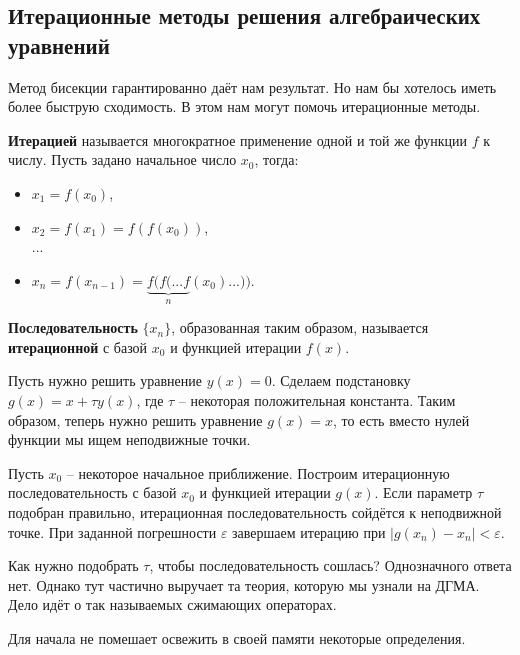 \documentclass[main.tex]{subfile}
\begin{document}
\subsection{Итерационные методы решения алгебраических уравнений}

Метод бисекции гарантированно даёт нам результат. Но нам бы хотелось иметь
более быструю сходимость. В этом нам могут помочь итерационные методы.

\begin{define}
	\textbf{Итерацией} называется многократное применение одной и той же
	функции $f$ к числу. Пусть задано начальное число $x_0$, тогда:
	\begin{itemize}[noitemsep, nolistsep]
		\item $x_1=f(x_0)$,
		\item $x_2=f(x_1)=f(f(x_0))$,\\
		...
		\item $x_n=f(x_{n-1})=\underset{n}{\underbrace{f(f(...f}}(x_0)...))$.
	\end{itemize}

	\textbf{Последовательность} $\{x_n\}$, образованная таким образом,
	называется \textbf{итерационной} с базой $x_0$ и функцией итерации $f(x)$.
\end{define}

\begin{algorithm}
	Пусть нужно решить уравнение $y(x)=0$. Сделаем подстановку
	$g(x)=x+\tau y(x)$, где $\tau$ -- некоторая положительная константа.
	Таким образом, теперь нужно решить уравнение $g(x)=x$, то есть вместо
	нулей функции мы ищем неподвижные точки.

	Пусть $x_0$ -- некоторое начальное приближение. Построим итерационную
	последовательность с базой $x_0$ и функцией итерации $g(x)$. Если
	параметр $\tau$ подобран правильно, итерационная последовательность
	сойдётся к неподвижной точке. При заданной погрешности $\varepsilon$
	завершаем итерацию при $|g(x_n)-x_n|<\varepsilon$.
\end{algorithm}

Как нужно подобрать $\tau$, чтобы последовательность сошлась? Однозначного ответа
нет. Однако тут частично выручает та теория, которую мы узнали на ДГМА. Дело
идёт о так называемых сжимающих операторах.

Для начала не помешает освежить в своей памяти некоторые определения.
\end{document}
